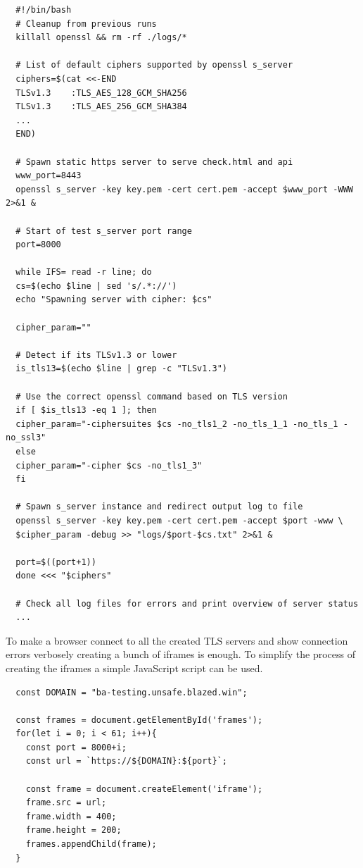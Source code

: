 \documentclass[12pt]{scrbook}
\begin{document}
\newpage

\begin{verbatim}
  #!/bin/bash
  # Cleanup from previous runs
  killall openssl && rm -rf ./logs/*

  # List of default ciphers supported by openssl s_server
  ciphers=$(cat <<-END
  TLSv1.3    :TLS_AES_128_GCM_SHA256
  TLSv1.3    :TLS_AES_256_GCM_SHA384
  ...
  END)

  # Spawn static https server to serve check.html and api
  www_port=8443
  openssl s_server -key key.pem -cert cert.pem -accept $www_port -WWW 2>&1 &

  # Start of test s_server port range
  port=8000

  while IFS= read -r line; do
  cs=$(echo $line | sed 's/.*://')
  echo "Spawning server with cipher: $cs"

  cipher_param=""

  # Detect if its TLSv1.3 or lower
  is_tls13=$(echo $line | grep -c "TLSv1.3")

  # Use the correct openssl command based on TLS version
  if [ $is_tls13 -eq 1 ]; then
  cipher_param="-ciphersuites $cs -no_tls1_2 -no_tls_1_1 -no_tls_1 -no_ssl3"
  else
  cipher_param="-cipher $cs -no_tls1_3"
  fi

  # Spawn s_server instance and redirect output log to file
  openssl s_server -key key.pem -cert cert.pem -accept $port -www \
  $cipher_param -debug >> "logs/$port-$cs.txt" 2>&1 &

  port=$((port+1))
  done <<< "$ciphers"

  # Check all log files for errors and print overview of server status
  ...
\end{verbatim}

\newpage

To make a browser connect to all the created TLS servers and show connection errors verbosely creating a bunch of iframes is enough.
To simplify the process of creating the iframes a simple JavaScript script can be used.

\begin{verbatim}
  const DOMAIN = "ba-testing.unsafe.blazed.win";

  const frames = document.getElementById('frames');
  for(let i = 0; i < 61; i++){
    const port = 8000+i;
    const url = `https://${DOMAIN}:${port}`;

    const frame = document.createElement('iframe');
    frame.src = url;
    frame.width = 400;
    frame.height = 200;
    frames.appendChild(frame);
  }
\end{verbatim}
\end{document}

